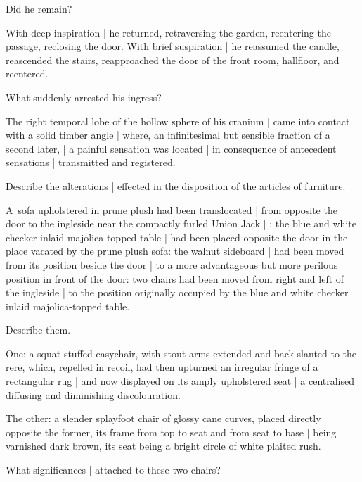 
Did he remain?

\Factual[~(legal)]
With deep inspiration |
he returned,
retraversing the garden, reentering the passage, reclosing the door.
With brief suspiration |
he reassumed the candle,
reascended the stairs,
reapproached the door of the front room, hallfloor,
and reentered.



What suddenly arrested his ingress?

\Science
The right temporal lobe of the hollow sphere of his cranium |
came into contact with a solid timber angle |
where, an infinitesimal but sensible fraction of a second later, |
a painful sensation was located |
in consequence of antecedent sensations |
transmitted and registered.


Describe the alterations |
effected in the disposition of the articles of
furniture.%

\Household
A~sofa upholstered in prune plush had been translocated |
from opposite the door to the ingleside near the compactly furled Union Jack |
:
the blue and white checker inlaid majolica-topped table |
had been placed opposite the door in the place vacated by the prune plush sofa:
the walnut sideboard |
had been moved from its position beside the door |
to a more advantageous but more perilous position in front of the door:
two chairs had been moved from right and left of the ingleside |
to the position originally occupied
by the blue and white checker inlaid majolica-topped table.%


Describe them.

\Philosophy
One:
a squat stuffed easychair,
with stout arms extended and back slanted to the rere,
which, repelled in recoil,
had then upturned an irregular fringe of a rectangular rug |
and now displayed on its amply upholstered seat |
a centralised diffusing and diminishing discolouration.

\Poetry
The other:
a slender splayfoot chair of glossy cane curves,
placed directly opposite the former,
its frame from top to seat and from seat to base |
being varnished dark brown,
its seat being a bright circle of white plaited rush.


What significances |
attached to these two chairs?

